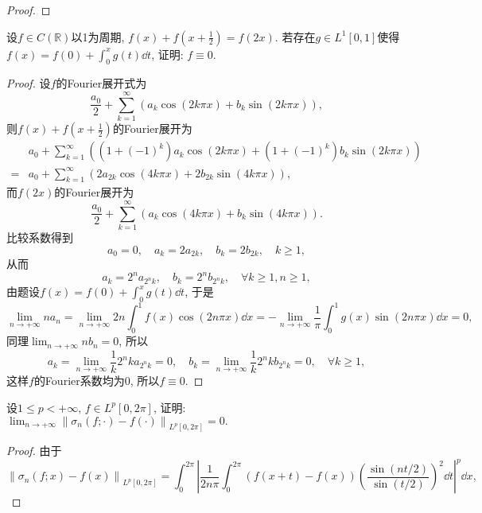 \begin{quiza}
\begin{proof}
\end{proof}
\woe 设\(f\in C(\mathbb{R})\)以1为周期, \(f(x)+f\left(x+\frac{1}{2}\right)=f(2x)\). 若存在\(g\in L^1[0,1]\)使得\(f(x)=f(0)+\int_{0}^{x}g(t)\dd t\), 证明: \(f\equiv 0\).
\begin{proof}
设\(f\)的Fourier展开式为\[\frac{a_0}{2}+\sum_{k=1}^{\infty}\left(a_k\cos\left(2k\pi x\right)+b_k\sin\left(2k\pi x\right)\right),\]则\(f(x)+f\left(x+\frac{1}{2}\right)\)的Fourier展开为\[\begin{split}
&a_0+\sum_{k=1}^{\infty}\left(\left(1+(-1)^k\right)a_k\cos(2k\pi x)+\left(1+(-1)^k\right)b_k\sin(2k\pi x)\right)\\=&a_0+\sum_{k=1}^{\infty}\left(2a_{2k}\cos\left(4k\pi x\right)+2b_{2k}\sin\left(4k\pi x\right)\right),
\end{split}\]而\(f(2x)\)的Fourier展开为\[\frac{a_0}{2}+\sum_{k=1}^{\infty}\left(a_k\cos(4k\pi x)+b_k\sin(4k\pi x)\right).\]比较系数得到\[a_0=0,\quad a_k=2a_{2k},\quad b_k=2b_{2k},\quad k\geqslant 1,\]从而\[a_k=2^na_{2^nk},\quad b_k=2^nb_{2^nk},\quad\forall k\geqslant 1,n\geqslant 1,\]由题设\(f(x)=f(0)+\int_{0}^{x}g(t)\dd t\), 于是\[\lim_{n\rightarrow+\infty}na_n=\lim_{n\rightarrow+\infty}2n\int_{0}^{1}f(x)\cos(2n\pi x)\dd x=-\lim_{n\rightarrow+\infty}\frac{1}{\pi}\int_{0}^{1}g(x)\sin\left(2n\pi x\right)\dd x=0,\]同理\(\lim_{n\rightarrow+\infty}nb_n=0\), 所以\[a_k=\lim_{n\rightarrow+\infty}\frac{1}{k}2^nka_{2^nk}=0,\quad b_k=\lim_{n\rightarrow+\infty}\frac{1}{k}2^nkb_{2^nk}=0,\quad\forall k\geqslant 1,\]这样\(f\)的Fourier系数均为\(0\), 所以\(f\equiv 0\).
\end{proof}
\woe 设\(1\leqslant p<+\infty,\,f\in L^p[0,2\pi]\), 证明: \(\lim_{n\rightarrow+\infty}\left\|\sigma_n(f;\cdot)-f(\cdot)\right\|_{L^p[0,2\pi]}=0.\)
\begin{proof}
由于\[\left\|\sigma_n(f;x)-f(x)\right\|_{L^p[0,2\pi]}=\int_{0}^{2\pi}\left|\frac{1}{2n\pi}\int_{0}^{2\pi}\left(f(x+t)-f(x)\right)\left(\frac{\sin\left(nt/2\right)}{\sin(t/2)}\right)^2\dd t\right|^p\dd x,\]
\end{proof}
\end{quiza}
